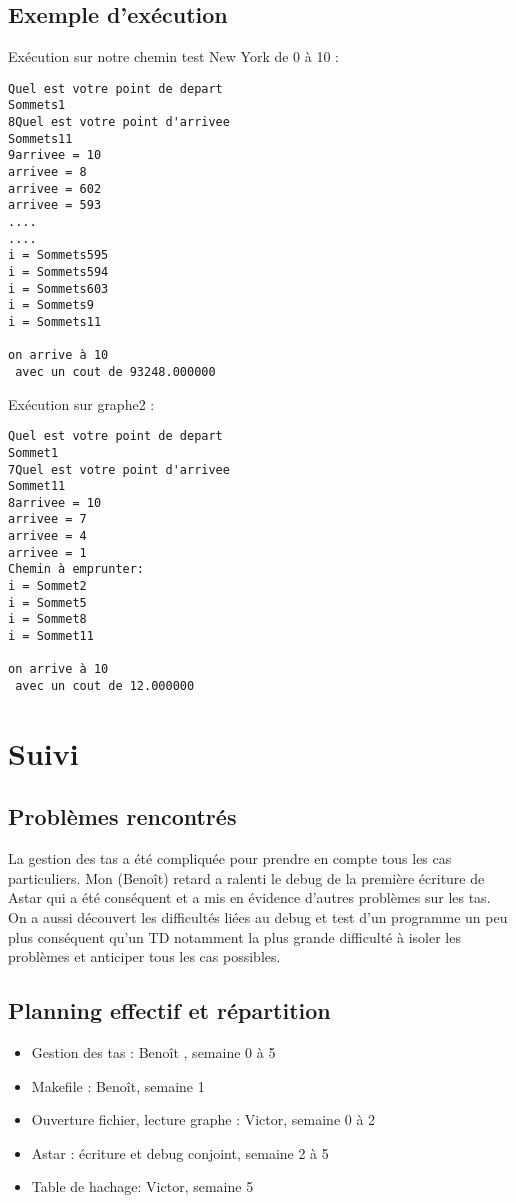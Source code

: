 \documentclass[12pt,a4paper]{article}
\begin{document}
        \subsection{Exemple d'exécution}
Exécution sur notre chemin test New York de 0 à 10 : 
\begin {verbatim}
Quel est votre point de depart
Sommets1
8Quel est votre point d'arrivee
Sommets11
9arrivee = 10 
arrivee = 8 
arrivee = 602 
arrivee = 593 
....
....
i = Sommets595
i = Sommets594
i = Sommets603
i = Sommets9
i = Sommets11

on arrive à 10 
 avec un cout de 93248.000000
\end{verbatim}
Exécution sur graphe2 : 
\begin{verbatim}
Quel est votre point de depart
Sommet1
7Quel est votre point d'arrivee
Sommet11
8arrivee = 10 
arrivee = 7 
arrivee = 4 
arrivee = 1 
Chemin à emprunter:
i = Sommet2
i = Sommet5
i = Sommet8
i = Sommet11

on arrive à 10 
 avec un cout de 12.000000
\end{verbatim}

\section{Suivi}
                \subsection{Problèmes rencontrés}
        La gestion des tas a été compliquée pour prendre en compte tous les cas particuliers. Mon (Benoît) retard a ralenti le debug de la première écriture de Astar qui a été conséquent et a mis en évidence d'autres problèmes sur les tas.
        On a aussi découvert les difficultés liées au debug et test d'un programme un peu plus conséquent qu'un TD notamment la plus grande difficulté à isoler les problèmes et anticiper tous les cas possibles. 
        

                \subsection{Planning effectif et répartition}
                \begin{itemize}
                        \item Gestion des tas : Benoît , semaine 0 à 5
                        \item Makefile : Benoît, semaine 1
                        \item Ouverture fichier, lecture graphe : Victor, semaine 0 à 2
                        \item Astar : écriture et debug conjoint, semaine 2 à 5
                        \item Table de hachage: Victor, semaine 5 
                \end{itemize}
\end{document}
